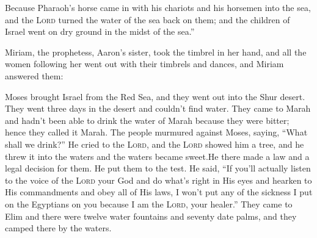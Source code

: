 \begin{inparaenum}
    
     Because Pharaoh's horse came in with his chariots and his horsemen into the sea, and the \textsc{Lord} turned the water of the sea back on them; and the children of Israel went on dry ground in the midst of the sea.''%
    
     Miriam, the prophetess, Aaron's sister, took the timbrel in her hand, and all the women following her went out with their timbrels and dances,%
     and Miriam answered them:\smallskip%
    
    
     Moses brought Israel from the Red Sea, and they went out into the Shur desert. They went three days in the desert and couldn't find water.%
     They came to Marah and hadn't been able to drink the water of Marah because they were bitter; hence they called it Marah.%
     The people murmured against Moses, saying, ``What shall we drink?''%
     He cried to the \textsc{Lord}, and the \textsc{Lord} showed him a tree, and he threw it into the waters and the waters became sweet.\hspace*{4em}He there made a law and a legal decision for them. He put them to the test.%
     He said, ``If you'll actually listen to the voice of the \textsc{Lord} your God and do what's right in His eyes and hearken to His commandments and obey all of His laws, I won't put any of the sickness I put on the Egyptians on you because I am the \textsc{Lord}, your healer.''%
     They came to Elim and there were twelve water fountains and seventy date palms, and they camped there by the waters.%
\end{inparaenum}
